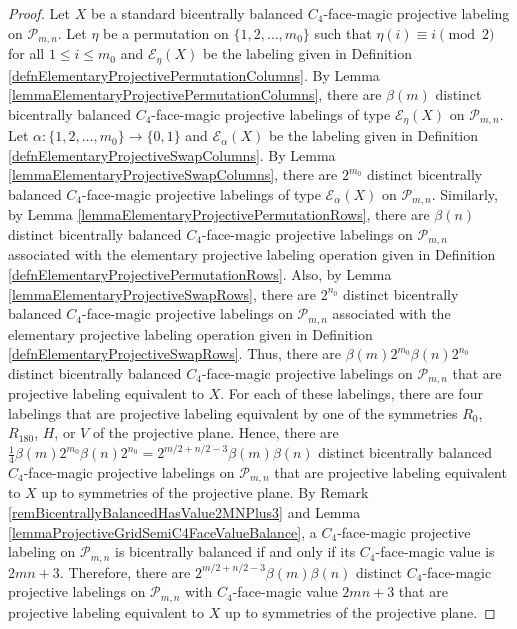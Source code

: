 \documentclass[12pt]{amsart}
\theoremstyle{definition}
\theoremstyle{plain}
\begin{document}
\begin{proof}
  Let $X$ be a standard bicentrally balanced $C_4$-face-magic projective labeling on $\mathcal{P}_{m,n}$.
  Let $\eta$ be a permutation on $\{1,2,\ldots,m_0\}$ such that $\eta(i)\equiv i \pmod{2}$ for all $1 \leqslant i \leqslant m_0$
  and $\mathcal{E}_{\eta}(X)$ be the labeling given in Definition \ref{defnElementaryProjectivePermutationColumns}.
  By Lemma \ref{lemmaElementaryProjectivePermutationColumns}, there are $\beta(m)$ distinct bicentrally balanced $C_4$-face-magic projective labelings
  of type $\mathcal{E}_{\eta}(X)$ on $\mathcal{P}_{m,n}$.
  Let $\alpha:\{1,2,\ldots,m_0\}\rightarrow \{0,1\}$ and $\mathcal{E}_{\alpha}(X)$ be the labeling given in Definition \ref{defnElementaryProjectiveSwapColumns}.
  By Lemma \ref{lemmaElementaryProjectiveSwapColumns}, there are $2^{m_0}$ distinct bicentrally balanced $C_4$-face-magic projective labelings
  of type $\mathcal{E}_{\alpha}(X)$ on $\mathcal{P}_{m,n}$.
  Similarly, by Lemma \ref{lemmaElementaryProjectivePermutationRows}, there are $\beta(n)$
  distinct bicentrally balanced $C_4$-face-magic projective labelings on $\mathcal{P}_{m,n}$ associated with the elementary projective labeling operation given
  in Definition \ref{defnElementaryProjectivePermutationRows}.
  Also, by Lemma \ref{lemmaElementaryProjectiveSwapRows}, there are $2^{n_0}$
  distinct bicentrally balanced $C_4$-face-magic projective labelings on $\mathcal{P}_{m,n}$ associated with the elementary projective labeling operation given
  in Definition \ref{defnElementaryProjectiveSwapRows}.
  Thus, there are $\beta(m) 2^{m_0} \beta(n) 2^{n_0}$ distinct bicentrally balanced $C_4$-face-magic projective labelings
  on $\mathcal{P}_{m,n}$ that are projective labeling equivalent to $X$.
  For each of these labelings, there are four labelings that are projective labeling equivalent by one of the symmetries
  $R_0$, $R_{180}$, $H$, or $V$ of the projective plane.
  Hence, there are $\tfrac{1}{4} \beta(m) 2^{m_0} \beta(n) 2^{n_0} = 2^{m/2+n/2-3} \beta(m) \beta(n)$ distinct bicentrally balanced $C_4$-face-magic projective labelings
  on $\mathcal{P}_{m,n}$ that are projective labeling equivalent to $X$ up to symmetries of the projective plane.
  By Remark \ref{remBicentrallyBalancedHasValue2MNPlus3} and Lemma \ref{lemmaProjectiveGridSemiC4FaceValueBalance}, a $C_4$-face-magic projective labeling on $\mathcal{P}_{m,n}$ is bicentrally balanced if and only if its $C_4$-face-magic value is $2mn+3$.
  Therefore, there are $2^{m/2+n/2-3} \beta(m) \beta(n)$ distinct $C_4$-face-magic projective labelings
  on $\mathcal{P}_{m,n}$ with $C_4$-face-magic value $2mn+3$ that are projective labeling equivalent to $X$ up to symmetries of the projective plane.


\end{proof}
\end{document}
